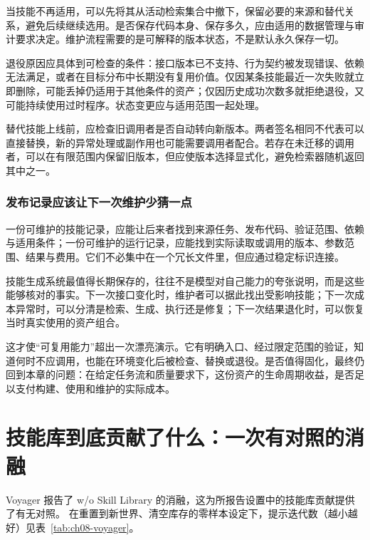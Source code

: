 当技能不再适用，可以先将其从活动检索集合中撤下，保留必要的来源和替代关系，避免后续继续选用。是否保存代码本身、保存多久，应由适用的数据管理与审计要求决定。维护流程需要的是可解释的版本状态，不是默认永久保存一切。

退役原因应具体到可检查的条件：接口版本已不支持、行为契约被发现错误、依赖无法满足，或者在目标分布中长期没有复用价值。仅因某条技能最近一次失败就立即删除，可能丢掉仍适用于其他条件的资产；仅因历史成功次数多就拒绝退役，又可能持续使用过时程序。状态变更应与适用范围一起处理。

替代技能上线前，应检查旧调用者是否自动转向新版本。两者签名相同不代表可以直接替换，新的异常处理或副作用也可能需要调用者配合。若存在未迁移的调用者，可以在有限范围内保留旧版本，但应使版本选择显式化，避免检索器随机返回其中之一。

\subsubsection{发布记录应该让下一次维护少猜一点}

一份可维护的技能记录，应能让后来者找到来源任务、发布代码、验证范围、依赖与适用条件；一份可维护的运行记录，应能找到实际读取或调用的版本、参数范围、结果与费用。它们不必集中在一个冗长文件里，但应通过稳定标识连接。

技能生成系统最值得长期保存的，往往不是模型对自己能力的夸张说明，而是这些能够核对的事实。下一次接口变化时，维护者可以据此找出受影响技能；下一次成本异常时，可以分清是检索、生成、执行还是修复；下一次结果退化时，可以恢复当时真实使用的资产组合。

这才使“可复用能力”超出一次漂亮演示。它有明确入口、经过限定范围的验证，知道何时不应调用，也能在环境变化后被检查、替换或退役。是否值得固化，最终仍回到本章的问题：在给定任务流和质量要求下，这份资产的生命周期收益，是否足以支付构建、使用和维护的实际成本。


\section{技能库到底贡献了什么：一次有对照的消融}
\label{sec:ch08-ablation}

Voyager 报告了 w/o Skill Library 的消融，这为所报告设置中的技能库贡献提供了有无对照。
在重置到新世界、清空库存的零样本设定下，提示迭代数（越小越好）见表~\ref{tab:ch08-voyager}。

